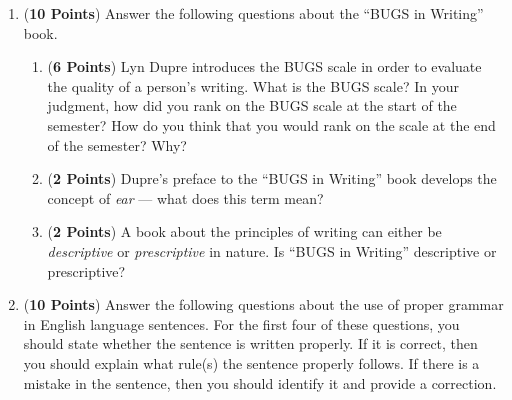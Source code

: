 \documentclass[12pt]{article}
\begin{document}
\begin{enumerate}


\newpage

\item ({\bf 10 Points}) Answer the following questions about the
  ``BUGS in Writing'' book.

\begin{enumerate}

\item ({\bf 6 Points}) Lyn Dupre introduces the BUGS scale in order to
  evaluate the quality of a person's writing.  What is the BUGS scale?  In
  your judgment, how did you rank on the BUGS scale at the start of
  the semester?  How do you think that you would rank on the scale at
  the end of the semester? Why?

\item ({\bf 2 Points}) Dupre's preface to the ``BUGS in Writing'' book
  develops the concept of {\em ear} --- what does this term mean?

\item ({\bf 2 Points}) A book about the principles of writing can
  either be {\em descriptive} or {\em prescriptive} in nature.  Is
  ``BUGS in Writing'' descriptive or prescriptive?

\end{enumerate}

\newpage

\item ({\bf 10 Points}) Answer the following questions about the use
  of proper grammar in English language sentences.  For the first four
  of these questions, you should state whether the sentence is written
  properly.  If it is correct, then you should explain what rule(s)
  the sentence properly follows.  If there is a mistake in the
  sentence, then you should identify it and provide a correction.

\begin{enumerate}





\end{enumerate}
\end{enumerate}
\end{document}
